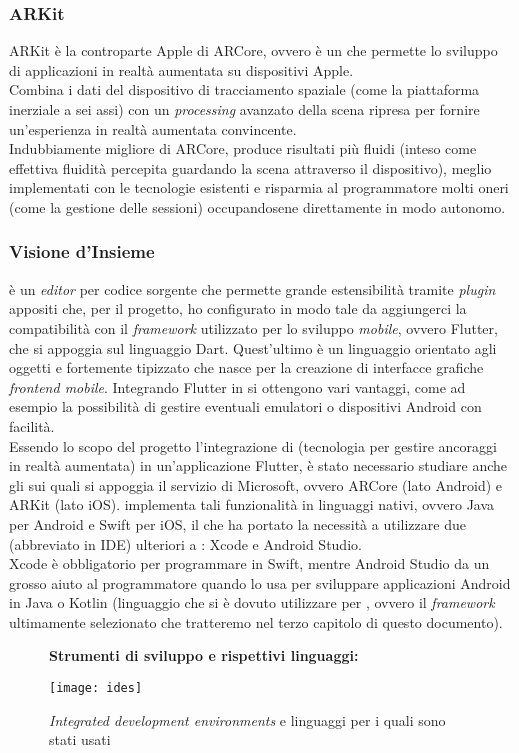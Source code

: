 \subsubsection{ARKit}
ARKit è la controparte Apple di ARCore, ovvero è un \sdk{} che permette lo sviluppo di applicazioni in realtà aumentata su dispositivi Apple.\\
Combina i dati del dispositivo di tracciamento spaziale (come la piattaforma inerziale a sei assi) con un \textit{processing} avanzato della scena ripresa per fornire un'esperienza in realtà aumentata convincente.\\
Indubbiamente migliore di ARCore, produce risultati più fluidi (inteso come effettiva fluidità percepita guardando la scena attraverso il dispositivo), meglio implementati con le tecnologie esistenti e risparmia al programmatore molti oneri (come la gestione delle sessioni) occupandosene direttamente in modo autonomo.

\subsubsection{Visione d'Insieme}
\vsc{} è un \textit{editor} per codice sorgente che permette grande estensibilità tramite \textit{plugin} appositi che, per il progetto, ho configurato in modo tale da aggiungerci la compatibilità con il \textit{framework} utilizzato per lo sviluppo \textit{mobile}, ovvero Flutter, che si appoggia sul linguaggio Dart. Quest'ultimo è un linguaggio orientato agli oggetti e fortemente tipizzato che nasce per la creazione di interfacce grafiche \textit{frontend mobile}. Integrando Flutter in \vsc{} si ottengono vari vantaggi, come ad esempio la possibilità di gestire eventuali emulatori o dispositivi Android con facilità.\\
Essendo lo scopo del progetto l'integrazione di \asa{} (tecnologia per gestire ancoraggi in realtà aumentata) in un'applicazione Flutter, è stato necessario studiare anche gli \sdk{} sui quali si appoggia il servizio di Microsoft, ovvero ARCore (lato Android) e ARKit (lato iOS). \asa{} implementa tali funzionalità in linguaggi nativi, ovvero Java per Android e Swift per iOS, il che ha portato la necessità a utilizzare due \ide{}(abbreviato in IDE) ulteriori a \vsc{}: Xcode e Android Studio.\\
Xcode è obbligatorio per programmare in Swift, mentre Android Studio da un grosso aiuto al programmatore quando lo usa per sviluppare applicazioni Android in Java o Kotlin (linguaggio che si è dovuto utilizzare per \aplug{}, ovvero il \textit{framework} ultimamente selezionato che tratteremo nel terzo capitolo di questo documento).
\begin{figure}[H]
    \textbf{Strumenti di sviluppo e rispettivi linguaggi:}
    \begin{center}
    \texttt{[image: ides]}
    \caption{\textit{Integrated development environments} e linguaggi per i quali sono stati usati}
    \end{center}
\end{figure}

